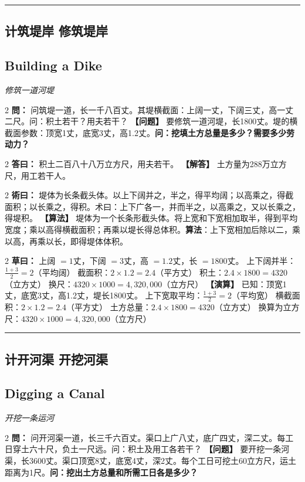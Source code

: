 \documentclass[11pt,a4paper]{article}
\newcommand{\longline}{\noindent\rule{\textwidth}{0.4pt}}
\newcommand{\bilingualProblem}[2]{%
  \vspace{0.6em}%
  \begin{paracol}{2}%
  \noindent\textcolor{problemcolor}{\textbf{問：}}#1%
  \switchcolumn%
  \noindent\textcolor{problemcolor}{\textbf{【问题】}}#2%
  \end{paracol}%
  \vspace{0.3em}%
}
\newcommand{\bilingualAnswer}[2]{%
  \begin{paracol}{2}%
  \noindent\textcolor{answercolor}{\textbf{答曰：}}#1%
  \switchcolumn%
  \noindent\textcolor{answercolor}{\textbf{【解答】}}#2%
  \end{paracol}%
  \vspace{0.3em}%
}
\newcommand{\bilingualMethod}[2]{%
  \begin{paracol}{2}%
  \noindent\textcolor{methodcolor}{\textbf{術曰：}}#1%
  \switchcolumn%
  \noindent\textcolor{methodcolor}{\textbf{【算法】}}#2%
  \end{paracol}%
  \vspace{0.3em}%
}
\newcommand{\bilingualWorking}[2]{%
  \begin{paracol}{2}%
  \noindent\textcolor{workingcolor}{\textbf{草曰：}}#1%
  \switchcolumn%
  \noindent\textcolor{workingcolor}{\textbf{【演算】}}#2%
  \end{paracol}%
  \vspace{0.3em}%
}
\newcommand{\bilingualSubsection}[2]{%
  \subsection{#1}
  \begin{center}
  {\small\color{sectioncolor}\textit{#2}}
  \end{center}
  \vspace{0.3em}
}
\begin{document}
\vspace{0.5em}
\longline

\subsection{计筑堤岸 \quad 修筑堤岸}
\bilingualSubsection{Building a Dike}{修筑一道河堤}

\bilingualProblem{%
问筑堤一道，长一千八百丈。其堤横截面：上阔一丈，下阔三丈，高一丈二尺。问：积土若干？用夫若干？%
}{%
要修筑一道河堤，长1800丈。堤的横截面参数：顶宽1丈，底宽3丈，高1.2丈。\textbf{问：挖填土方总量是多少？需要多少劳动力？}%
}

\bilingualAnswer{%
积土二百八十八万立方尺，用夫若干。%
}{%
土方量为288万立方尺，用工若干人。%
}

\bilingualMethod{%
堤体为长条截头体。以上下阔并之，半之，得平均阔；以高乘之，得截面积；以长乘之，得积。术曰：上下广各一，并而半之，以高乘之，又以长乘之，得堤积。%
}{%
堤体为一个长条形截头体。将上宽和下宽相加取半，得到平均宽度；乘以高得横截面积；再乘以堤长得总体积。\textbf{算法}：上下宽相加后除以二，乘以高，再乘以长，即得堤体体积。%
}

\bilingualWorking{%
上阔 $= 1$丈，下阔 $= 3$丈，高 $= 1.2$丈，长 $= 1800$丈。
上下阔并半：$\displaystyle\frac{1+3}{2} = 2$（平均阔）
截面积：$2 \times 1.2 = 2.4$（平方丈）
积土：$2.4 \times 1800 = 4320$（立方丈）
换尺：$4320 \times 1000 = 4{,}320{,}000$（立方尺）%
}{%
已知：顶宽1丈，底宽3丈，高1.2丈，堤长1800丈。
上下宽取平均：$\displaystyle\frac{1+3}{2} = 2$（平均宽）
横截面积：$2 \times 1.2 = 2.4$（平方丈）
土方总量：$2.4 \times 1800 = 4320$（立方丈）
换算为立方尺：$4320 \times 1000 = 4{,}320{,}000$（立方尺）%
}

\vspace{0.5em}
\longline

\subsection{计开河渠 \quad 开挖河渠}
\bilingualSubsection{Digging a Canal}{开挖一条运河}

\bilingualProblem{%
问开河渠一道，长三千六百丈。渠口上广八丈，底广四丈，深二丈。每工日穿土六十尺，负土一尺远。问：积土及用工各若干？%
}{%
要开挖一条河渠，长3600丈。渠口顶宽8丈，底宽4丈，深2丈。每个工日可挖土60立方尺，运土距离为1尺。\textbf{问：挖出土方总量和所需工日各是多少？}%
}
\end{document}
